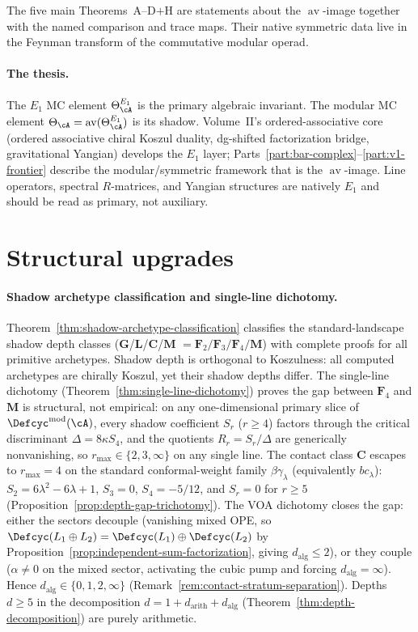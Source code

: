 The five main Theorems~A--D$+$H are statements about the
$\operatorname{av}$-image together with the named comparison and
trace maps.  Their native symmetric data live in the Feynman
transform of the commutative modular operad.

\paragraph{The thesis.}
The $E_1$ MC element $\Theta^{E_1}_\cA$ is the primary
algebraic invariant. The modular MC element
$\Theta_\cA = \operatorname{av}(\Theta^{E_1}_\cA)$ is its
shadow. Volume~II's ordered-associative core (ordered
associative chiral Koszul duality, dg-shifted factorization
bridge, gravitational Yangian) develops the $E_1$ layer;
Parts~\ref{part:bar-complex}--\ref{part:v1-frontier} describe the modular/symmetric framework that is the
$\operatorname{av}$-image. Line operators, spectral $R$-matrices,
and Yangian structures are natively $E_1$ and
should be read as primary, not auxiliary.


\section{Structural upgrades}
\label{sec:concordance-structural-upgrades}

\paragraph{Shadow archetype classification and single-line dichotomy.}
Theorem~\ref{thm:shadow-archetype-classification} classifies the
standard-landscape shadow depth classes
($\mathbf{G}$/$\mathbf{L}$/$\mathbf{C}$/$\mathbf{M}$
$= \mathbf{F}_2/\mathbf{F}_3/\mathbf{F}_4/\mathbf{M}$)
with complete proofs for all primitive archetypes.
Shadow depth is orthogonal
to Koszulness: all computed archetypes are chirally Koszul, yet their
shadow depths differ.
The single-line dichotomy
(Theorem~\ref{thm:single-line-dichotomy}) proves the gap between
$\mathbf{F}_4$ and $\mathbf{M}$ is structural, not empirical:
on any one-dimensional primary slice of
$\Defcyc^{\mathrm{mod}}(\cA)$, every shadow coefficient
$S_r$ ($r \geq 4$) factors through the critical discriminant
$\Delta = 8\kappa S_4$, and the quotients $R_r = S_r/\Delta$
are generically nonvanishing, so $r_{\max} \in \{2, 3, \infty\}$
on any single line. The contact class $\mathbf{C}$ escapes to
$r_{\max} = 4$ on the standard conformal-weight family
$\beta\gamma_\lambda$ \textup{(}equivalently $bc_\lambda$\textup{)}:
$S_2 = 6\lambda^2 - 6\lambda + 1$, $S_3 = 0$,
$S_4 = -5/12$, and $S_r = 0$ for $r \geq 5$
\textup{(}Proposition~\ref{prop:depth-gap-trichotomy}\textup{)}.
The VOA dichotomy closes the gap: either the sectors
decouple (vanishing mixed OPE, so
$\Defcyc(L_1 \oplus L_2)
= \Defcyc(L_1) \oplus \Defcyc(L_2)$
by Proposition~\ref{prop:independent-sum-factorization},
giving $d_{\mathrm{alg}} \leq 2$), or they couple
($\alpha \neq 0$ on the mixed sector, activating the
cubic pump and forcing $d_{\mathrm{alg}} = \infty$).
Hence $d_{\mathrm{alg}} \in \{0, 1, 2, \infty\}$
(Remark~\ref{rem:contact-stratum-separation}).
Depths $d \geq 5$ in the decomposition
$d = 1 + d_{\mathrm{arith}} + d_{\mathrm{alg}}$
(Theorem~\ref{thm:depth-decomposition})
are purely arithmetic.

